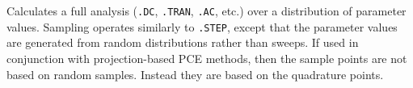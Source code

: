 


 
Calculates a full analysis (\verb|.DC|, \verb|.TRAN|, \verb|.AC|, etc.) over a distribution of
parameter values.  Sampling operates similarly to \verb|.STEP|, except that the parameter
values are generated from random distributions rather than sweeps.  
If used in conjunction 
with projection-based PCE methods, then the sample points are not based on random samples.  
Instead they are based on the quadrature points.


